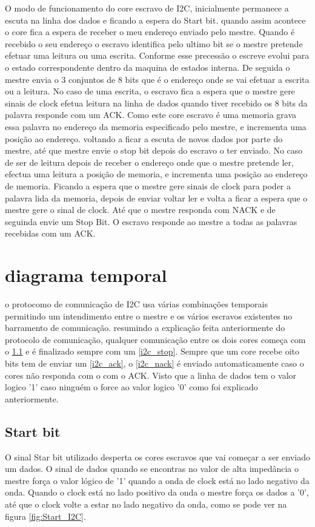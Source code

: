 O modo de funcionamento do core escravo de I2C, inicialmente permanece a escuta na linha dos dados e ficando a espera do Start bit. quando assim acontece o core fica a espera de receber o meu endereço enviado pelo mestre. Quando é recebido o seu endereço o escravo identifica pelo ultimo bit se o mestre pretende efetuar uma leitura ou uma escrita. Conforme esse precessão o escreve evolui para o estado correspondente dentro da maquina de estados interna. De seguida o mestre envia o 3 conjuntos de 8 bits que é o endereço onde se vai efetuar a escrita ou a leitura. No caso de uma escrita, o escravo fica a espera que o mestre gere sinais de clock efetua leitura na linha de dados quando tiver recebido os 8 bits da palavra responde com um ACK. Como este core escravo é uma memoria grava essa palavra no endereço da memoria especificado pelo mestre, e incrementa uma posição ao endereço. voltando a ficar a escuta de novos dados por parte do mestre, até que mestre envie o stop bit depois do escravo o ter enviado. No caso de ser de leitura depois de receber o endereço onde que o mestre pretende ler, efectua uma leitura a posição de memoria, e incrementa uma posição ao endereço de memoria. Ficando a espera que o mestre gere sinais de clock para poder a palavra lida da memoria, depois de enviar voltar ler e volta a ficar a espera que o mestre gere o sinal de clock. Até que o mestre responda com NACK e de seguinda envie um Stop Bit. O escravo responde ao mestre a todas as palavras recebidas com um ACK.


\section{diagrama temporal}
\label{i2c_diagrama}
o protocomo de comunicação de I2C usa várias combinações temporais permitindo um intendimento entre o mestre e os vários escravos existentes no barramento de comunicação. resumindo a explicação feita anteriormente do protocolo de comunicação, qualquer comunicação entre os dois cores começa com o \ref{i2c_start} e é finalizado sempre com um \ref{i2c_stop}. Sempre que um core recebe oito bits tem de enviar um \ref{i2c_ack}, o \ref{i2c_nack} é enviado automaticamente caso o cores não responda com o com o ACK. Visto que a linha de dados tem o valor logico '1' caso ninguém o force ao valor logico '0' como foi explicado anteriormente.

\subsection{Start bit}
\label{i2c_start}
O sinal Star bit utilizado desperta os cores escravos que vai começar a ser enviado um dados. O sinal de dados quando se encontras no valor de alta impedância o mestre força o valor lógico de '1' quando a onda de clock está no lado negativo da onda. Quando o clock está no lado positivo da onda o mestre força os dados a '0', até que o clock volte a estar no lado negativo da onda, como se pode ver na figura \ref{fig:Start_I2C}. 

